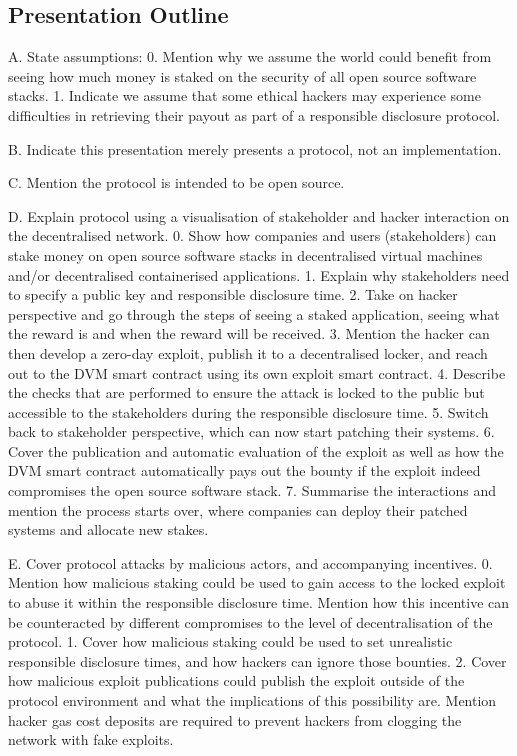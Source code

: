 \documentclass{article}
\begin{document}
\subsection{Presentation Outline}
A. State assumptions: 
0. Mention why we assume the world could benefit from seeing how much money is staked on the security of all open source software stacks. 
1. Indicate we assume that some ethical hackers may experience some difficulties in retrieving their payout as part of a responsible disclosure protocol.

B. Indicate this presentation merely presents a protocol, not an implementation.

C. Mention the protocol is intended to be open source.

D. Explain protocol using a visualisation of stakeholder and hacker interaction on the decentralised network.
0. Show how companies and users (stakeholders) can stake money on open source software stacks in decentralised virtual machines and/or decentralised containerised applications.
1. Explain why stakeholders need to specify a public key and responsible disclosure time.
2. Take on hacker perspective and go through the steps of seeing a staked application, seeing what the reward is and when the reward will be received. 
3. Mention the hacker can then develop a zero-day exploit, publish it to a decentralised locker, and reach out to the DVM smart contract using its own exploit smart contract.
4. Describe the checks that are performed to ensure the attack is locked to the public but accessible to the stakeholders during the responsible disclosure time.
5. Switch back to stakeholder perspective, which can now start patching their systems.
6. Cover the publication and automatic evaluation of the exploit as well as how the DVM smart contract automatically pays out the bounty if the exploit indeed compromises the open source software stack.
7. Summarise the interactions and mention the process starts over, where companies can deploy their patched systems and allocate new stakes.

E. Cover protocol attacks by malicious actors, and accompanying incentives.
0. Mention how malicious staking could be used to gain access to the locked exploit to abuse it within the responsible disclosure time. Mention how this incentive can be counteracted by different compromises to the level of decentralisation of the protocol. 
1. Cover how malicious staking could be used to set unrealistic responsible disclosure times, and how hackers can ignore those bounties.
2. Cover how malicious exploit publications could publish the exploit outside of the protocol environment and what the implications of this possibility are. Mention hacker gas cost deposits are required to prevent hackers from clogging the network with fake exploits.
\end{document}
